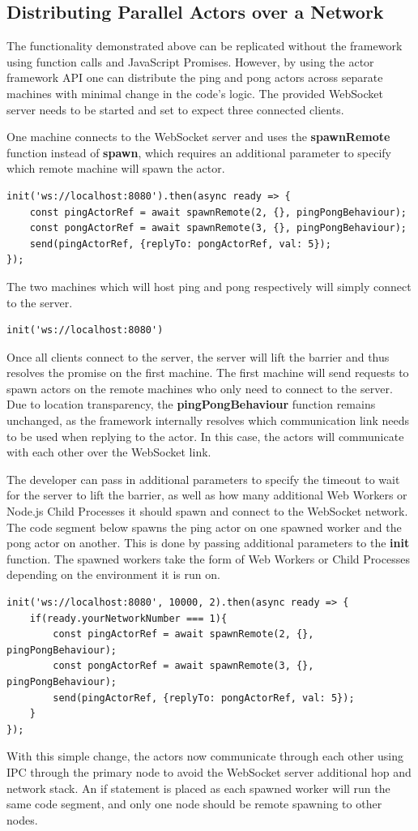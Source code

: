 \documentclass[12pt, a4paper]{report}
\theoremstyle{definition}
\theoremstyle{definition}%
\theoremstyle{definition}%
\theoremstyle{definition}%
\theoremstyle{definition}%
\theoremstyle{definition}%
\begin{document}
\subsection{Distributing Parallel Actors over a Network}
The functionality demonstrated above can be replicated without the framework using function calls and JavaScript Promises. However, by using the actor framework API one can distribute the ping and pong actors across separate machines with minimal change in the code's logic. The provided WebSocket server needs to be started and set to expect three connected clients. 

One machine connects to the WebSocket server and uses the \textbf{spawnRemote} function instead of \textbf{spawn}, which requires an additional parameter to specify which remote machine will spawn the actor.
\begin{lstlisting}
init('ws://localhost:8080').then(async ready => {
    const pingActorRef = await spawnRemote(2, {}, pingPongBehaviour);
    const pongActorRef = await spawnRemote(3, {}, pingPongBehaviour);
    send(pingActorRef, {replyTo: pongActorRef, val: 5});
});
\end{lstlisting}

The two machines which will host ping and pong respectively will simply connect to the server.
\begin{lstlisting}
init('ws://localhost:8080')
\end{lstlisting}

Once all clients connect to the server, the server will lift the barrier and thus resolves the promise on the first machine. The first machine will send requests to spawn actors on the remote machines who only need to connect to the server. Due to location transparency, the \textbf{pingPongBehaviour} function remains unchanged, as the framework internally resolves which communication link needs to be used when replying to the actor. In this case, the actors will communicate with each other over the WebSocket link.

The developer can pass in additional parameters to specify the timeout to wait for the server to lift the barrier, as well as how many additional Web Workers or Node.js Child Processes it should spawn and connect to the WebSocket network. The code segment below spawns the ping actor on one spawned worker and the pong actor on another. This is done by passing additional parameters to the \textbf{init} function. The spawned workers take the form of Web Workers or Child Processes depending on the environment it is run on.
\begin{lstlisting}
init('ws://localhost:8080', 10000, 2).then(async ready => {
    if(ready.yourNetworkNumber === 1){
        const pingActorRef = await spawnRemote(2, {}, pingPongBehaviour);
        const pongActorRef = await spawnRemote(3, {}, pingPongBehaviour);
        send(pingActorRef, {replyTo: pongActorRef, val: 5});
    }
});
\end{lstlisting}
With this simple change, the actors now communicate through each other using IPC through the primary node to avoid the WebSocket server additional hop and network stack. An if statement is placed as each spawned worker will run the same code segment, and only one node should be remote spawning to other nodes.
\end{document}
